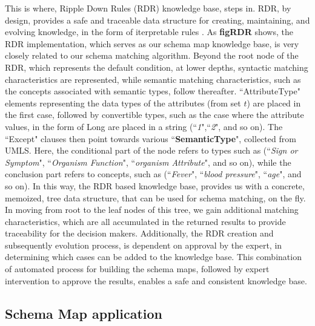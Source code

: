 This is where, Ripple Down Rules (RDR) knowledge base, steps in. RDR, by design, provides a safe and traceable data structure for creating, maintaining, and evolving knowledge, in the form of iterpretable rules \cite{compton1992ripple, richards2009two, kim2018rdr}. As \textbf{figRDR} shows, the RDR implementation, which serves as our schema map knowledge base, is very closely related to our schema matching algorithm. Beyond the root node of the RDR, which represents the default condition, at lower depths, syntactic matching characteristics are represented, while semantic matching characteristics, such as the concepts associated with semantic types, follow thereafter. ``AttributeType" elements representing the data types of the attributes (from set $t$) are placed in the first case, followed by convertible types, such as the case where the attribute values, in the form of Long are placed in a string (``\textit{1}",``\textit{2}", and so on). The ``Except" clauses then point towards various ``\textbf{SemanticType}", collected from UMLS. Here, the conditional part of the node refers to types such as (``\textit{Sign or Symptom}", ``\textit{Organism Function}", ``\textit{organism Attribute}", and so on), while the conclusion part refers to concepts, such as (``\textit{Fever}", ``\textit{blood pressure}", ``\textit{age}", and so on). In this way, the RDR based knowledge base, provides us with a concrete, memoized, tree data structure, that can be used for schema matching, on the fly. In moving from root to the leaf nodes of this tree, we gain additional matching characteristics, which are all accumulated in the returned results to provide traceability for the decision makers. Additionally, the RDR creation and subsequently evolution process, is dependent on approval by the expert, in determining which cases can be added to the knowledge base. This combination of automated process for building the schema maps, followed by expert intervention to approve the results, enables a safe and consistent knowledge base. 

\subsection*{Schema Map application}
\label{schema_map_evol}

